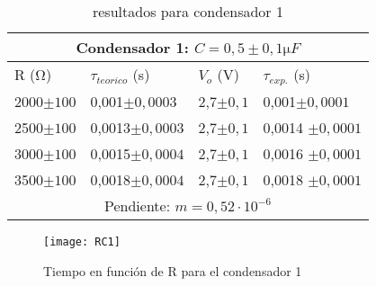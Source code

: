 \documentclass[a4paper,12pt,spanish]{article}
\begin{document}
\begin{table}[H]
	\centering
	\begin{tabular}{|llll|}
		\hline
		\multicolumn{4}{|c|}{Condensador 1: $C = 0,5\pm 0,1 \si{\micro F}$}                                                       \\ \hline
		\multicolumn{1}{|l|}{R ($\si{\ohm}$)}    & \multicolumn{1}{l|}{$\tau_{teorico}$ (s)} & \multicolumn{1}{l|}{$V_o$ (V)} & $\tau_{exp.} $ (s) \\ \hline
		\multicolumn{1}{|l|}{2000$\pm100$} & \multicolumn{1}{l|}{0,001$\pm 0,0003$}       & \multicolumn{1}{l|}{2,7$\pm 0,1$}   & 0,001$\pm 0,0001$            \\ \hline
		\multicolumn{1}{|l|}{2500$\pm100$} & \multicolumn{1}{l|}{0,0013$\pm 0,0003$}     & \multicolumn{1}{l|}{2,7$\pm 0,1$}   & 0,0014 $\pm 0,0001$          \\ \hline
		\multicolumn{1}{|l|}{3000$\pm100$} & \multicolumn{1}{l|}{0,0015$\pm 0,0004$}      & \multicolumn{1}{l|}{2,7$\pm 0,1$}   & 0,0016 $\pm 0,0001$          \\ \hline
		\multicolumn{1}{|l|}{3500$\pm100$} & \multicolumn{1}{l|}{0,0018$\pm 0,0004$}     & \multicolumn{1}{l|}{2,7$\pm 0,1$}   & 0,0018    $\pm 0,0001$       \\ \hline
		\multicolumn{4}{|c|}{Pendiente: $m = 0,52 \cdot 10^{-6}$}                                               \\ \hline
	\end{tabular}
	\caption{resultados para condensador 1}
\end{table}

\begin{figure}[H]
	\centering
	\texttt{[image: RC1]}
	\caption{Tiempo en función de R para el condensador 1}
	\label{fig:rc1}
\end{figure}
\end{document}
